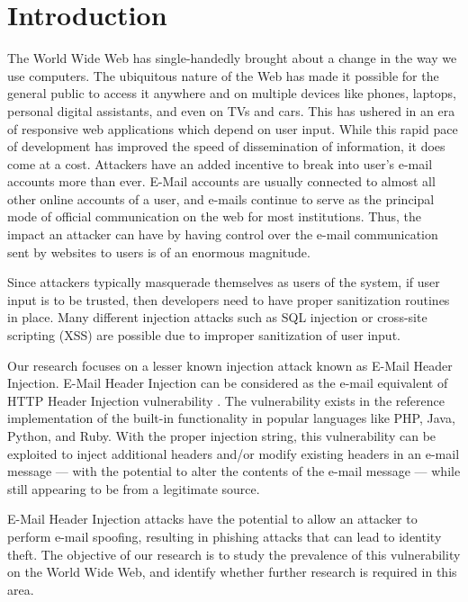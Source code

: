 \section{Introduction}
	The World Wide Web has single-handedly brought about a change in the way we use computers. The ubiquitous nature of the Web has made it possible for the general public to access it anywhere and on multiple devices like phones, laptops, personal digital assistants, and even on TVs and cars. This has ushered in an era of responsive web applications which depend on user input. While this rapid pace of development has improved the speed of dissemination of information, it does come at a cost. Attackers have an added incentive to break into user's e-mail accounts more than ever. E-Mail accounts are usually connected to almost all other online accounts of a user, and e-mails continue to serve as the principal mode of official communication on the web for most institutions. Thus, the impact an attacker can have by having control over the e-mail communication sent by websites to users is of an enormous magnitude. 
	
	Since attackers typically masquerade themselves as users of the system, if user input is to be trusted, then developers need to have proper sanitization routines in place. Many different injection attacks such as SQL injection or cross-site scripting (XSS) \cite{OWASPT10} are possible due to improper sanitization of user input. 
	
	Our research focuses on a lesser known injection attack known as E-Mail Header Injection. E-Mail Header Injection can be considered as the e-mail equivalent of HTTP Header Injection vulnerability \cite{wiki:HTTP_headerinjection}. The vulnerability exists in the reference implementation of the built-in  functionality in popular languages like PHP, Java, Python, and Ruby. With the proper injection string, this vulnerability can be exploited to inject additional headers and/or modify existing headers in an e-mail message --- with the potential to alter the contents of the e-mail message --- while still appearing to be from a legitimate source.
	
	E-Mail Header Injection attacks have the potential to allow an attacker to perform e-mail spoofing, resulting in phishing attacks that can lead to identity theft.
	The objective of our research is to study the prevalence of this vulnerability on the World Wide Web, and identify whether further research is required in this area.
	
